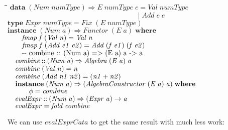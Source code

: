 \documentclass[10pt]{article}
\newlength{\lwidth}\setlength{\lwidth}{4.5cm}
\newlength{\cwidth}\setlength{\cwidth}{8mm} %
\newcommand{\Conid}[1]{\mathit{#1}}
\newcommand{\Varid}[1]{\mathit{#1}}
\begin{document}
\begin{tabbing}
\qquad\=\hspace{\lwidth}\=\hspace{\cwidth}\=\+\kill
${\mathbf{data}\;(\Conid{Num}\;\Varid{numType})\Rightarrow \Conid{E}\;\Varid{numType}\;\Varid{e}\mathrel{=}\Conid{Val}\;\Varid{numType}}$\\
${\phantom{\mathbf{data}\;(\Conid{Num}\;\Varid{numType})\Rightarrow \Conid{E}\;\Varid{numType}\;\Varid{e}\mbox{}}\mid \Conid{Add}\;\Varid{e}\;\Varid{e}}$\\
${}$\\
${\mathbf{type}\;\Conid{Expr}\;\Varid{numType}\mathrel{=}\Conid{Fix}\;(\Conid{E}\;\Varid{numType})}$\\
${}$\\
${\mathbf{instance}\;(\Conid{Num}\;\Varid{a})\Rightarrow \Conid{Functor}\;(\Conid{E}\;\Varid{a})\;\mathbf{where}}$\\
${\hskip2.00em\relax\Varid{fmap}\;\Varid{f}\;(\Conid{Val}\;\Varid{n})\mathrel{=}\Conid{Val}\;\Varid{n}}$\\
${\hskip2.00em\relax\Varid{fmap}\;\Varid{f}\;(\Conid{Add}\;\Varid{e1}\;\Varid{e2})\mathrel{=}\Conid{Add}\;(\Varid{f}\;\Varid{e1})\;(\Varid{f}\;\Varid{e2})}$\\
${}$\\
${\mbox{\qquad-{}-  combine :: (Num a) => (E a) a -> a}}$\\
${\hskip1.00em\relax\Varid{combine}\mathbin{::}(\Conid{Num}\;\Varid{a})\Rightarrow \Conid{Algebra}\;(\Conid{E}\;\Varid{a})\;\Varid{a}}$\\
${\hskip1.00em\relax\Varid{combine}\;(\Conid{Val}\;\Varid{n})\mathrel{=}\Varid{n}}$\\
${\hskip1.00em\relax\Varid{combine}\;(\Conid{Add}\;\Varid{n1}\;\Varid{n2})\mathrel{=}(\Varid{n1}\mathbin{+}\Varid{n2})}$\\
${}$\\
${\hskip1.00em\relax\mathbf{instance}\;(\Conid{Num}\;\Varid{a})\Rightarrow (\Conid{AlgebraConstructor}\;(\Conid{E}\;\Varid{a})\;\Varid{a})\;\mathbf{where}}$\\
${\hskip1.00em\relax\hskip2.00em\relax\Varid{\phi}\mathrel{=}\Varid{combine}}$\\
${}$\\
${\hskip1.00em\relax\Varid{evalExpr}\mathbin{::}(\Conid{Num}\;\Varid{a})\Rightarrow (\Conid{Expr}\;\Varid{a})\to \Varid{a}}$\\
${\hskip1.00em\relax\Varid{evalExpr}\mathrel{=}\Varid{fold}\;\Varid{combine}}$
\end{tabbing}
We can use \ensuremath{\Varid{evalExprCata}} to get the same result with much less work:
\end{document}
